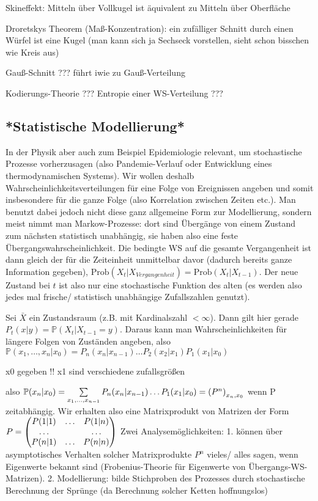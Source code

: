 Skineffekt: Mitteln über Vollkugel ist äquivalent zu Mitteln über Oberfläche

Droretskys Theorem (Maß-Konzentration): ein zufälliger Schnitt durch einen Würfel ist eine Kugel (man kann sich ja Sechseck vorstellen, sieht schon bisschen wie Kreis aus)

Gauß-Schnitt ??? führt iwie zu Gauß-Verteilung

Kodierungs-Theorie ??? Entropie einer WS-Verteilung ???



	\subsection{*Statistische Modellierung*}
In der Physik aber auch zum Beispiel Epidemiologie relevant, um stochastische Prozesse vorherzusagen (also Pandemie-Verlauf oder Entwicklung eines thermodynamischen Systems). Wir wollen deshalb Wahrscheinlichkeitsverteilungen für eine Folge von Ereignissen angeben und somit insbesondere für die ganze Folge (also Korrelation zwischen Zeiten etc.). Man benutzt dabei jedoch nicht diese ganz allgemeine Form zur Modellierung, sondern meist nimmt man Markow-Prozesse: dort sind Übergänge von einem Zustand zum nächsten statistisch unabhängig, sie haben also eine feste Übergangswahrscheinlichkeit. Die bedingte WS auf die gesamte Vergangenheit ist dann gleich der für die Zeiteinheit unmittelbar davor (dadurch bereits ganze Information gegeben), $\text{Prob}(X_t|X_{Vergangenheit}) = \text{Prob}(X_t|X_{t-1})$. Der neue Zustand bei $t$ ist also nur eine stochastische Funktion des alten (es werden also jedes mal frische/ statistisch unabhängige Zufallszahlen genutzt).

Sei $\bar{X}$ ein Zustandsraum (z.B. mit Kardinalszahl $< \infty$). Dann gilt hier gerade $P_t(x|y)= \mathbb{P}(X_t|X_{t-1}=y)$. Daraus kann man Wahrscheinlichkeiten für längere Folgen von Zuständen angeben, also $\mathbb{P}(x_1, \dots, x_n|x_0) = P_n(x_n|x_{n-1}) \dots P_2(x_2|x_1) P_1(x_1|x_0)$

x0 gegeben !! x1 sind verschiedene zufallsgrößen

also $\mathbb{P}(x_n|x_0) = \sum\limits_{x_1, \dots, x_{n-1}} P_n(x_n|x_{n-1}) \dots P_1(x_1|x_0) = \qty(P^n)_{x_n, x_0}$ wenn P zeitabhängig. Wir erhalten also eine Matrixprodukt von Matrizen der Form $P = \mqty( P(1|1) & \dots & P(1|n) \\ \dots & & \dots \\ P(n|1) & \dots & P(n|n) )$
Zwei Analysemöglichkeiten: 
1. können über asymptotisches Verhalten solcher Matrixprodukte $P^n$ vieles/ alles sagen, wenn Eigenwerte bekannt sind (Frobenius-Theorie für Eigenwerte von Übergangs-WS-Matrizen).
2. Modellierung: bilde Stichproben des Prozesses durch stochastische Berechnung der Sprünge (da Berechnung solcher Ketten hoffnungslos)

